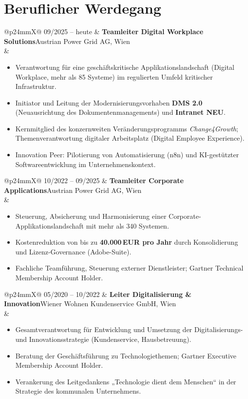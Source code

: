 \documentclass[10.5pt]{article}
\makeatletter
\newcommand{\entry}[4]{%
  \begin{tabularx}{\textwidth}{@{}p{24mm}X@{}}
    {\leavevmode\small\color{muted}#1} & {\bfseries #2}\hfill{\small\color{muted}#3}\\[1pt]
    & \begin{minipage}[t]{\linewidth}#4\end{minipage}
  \end{tabularx}\par\vspace{5pt}}
\makeatother
\begin{document}
\section{Beruflicher Werdegang}

\entry{09/2025 -- heute}{Teamleiter Digital Workplace Solutions}{Austrian Power Grid AG, Wien}{%
\begin{itemize}
  \item Verantwortung für eine geschäftskritische Applikationslandschaft (Digital Workplace, mehr als 85 Systeme) im regulierten Umfeld kritischer Infrastruktur.
  \item Initiator und Leitung der Modernisierungsvorhaben \textbf{DMS 2.0} (Neuausrichtung des Dokumentenmanagements) und \textbf{Intranet NEU}.
  \item Kernmitglied des konzernweiten Veränderungsprogramms \emph{Change4Growth}; Themenverantwortung digitaler Arbeitsplatz (Digital Employee Experience).
  \item Innovation Peer: Pilotierung von Automatisierung (n8n) und KI-gestützter Softwareentwicklung im Unternehmenskontext.
\end{itemize}}

\entry{10/2022 -- 09/2025}{Teamleiter Corporate Applications}{Austrian Power Grid AG, Wien}{%
\begin{itemize}
  \item Steuerung, Absicherung und Harmonisierung einer Corporate-Applikationslandschaft mit mehr als 340 Systemen.
  \item Kostenreduktion von bis zu \textbf{40.000\,EUR pro Jahr} durch Konsolidierung und Lizenz-Governance (Adobe-Suite).
  \item Fachliche Teamführung, Steuerung externer Dienstleister; Gartner Technical Membership Account Holder.
\end{itemize}}

\entry{05/2020 -- 10/2022}{Leiter Digitalisierung \& Innovation}{Wiener Wohnen Kundenservice GmbH, Wien}{%
\begin{itemize}
  \item Gesamtverantwortung für Entwicklung und Umsetzung der Digitalisierungs- und Innovationsstrategie (Kundenservice, Hausbetreuung).
  \item Beratung der Geschäftsführung zu Technologiethemen; Gartner Executive Membership Account Holder.
  \item Verankerung des Leitgedankens „Technologie dient dem Menschen“ in der Strategie des kommunalen Unternehmens.
\end{itemize}}
\end{document}
